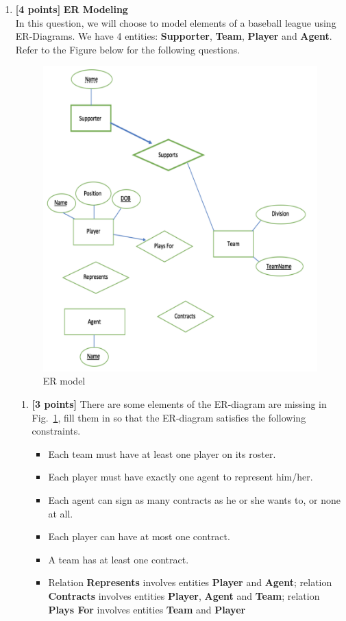 \documentclass[10pt]{article}
\begin{document}
\begin{enumerate}

	\item \textbf{[4 points]} \textbf{ER Modeling} \\
	      In this question, we will choose to model elements of a baseball league using ER-Diagrams. We have 4 entities:
	      \textbf{Supporter}, \textbf{Team}, \textbf{Player} and \textbf{Agent}. Refer to the Figure below for the following questions.
	      \begin{figure}[ht]
		      \centering
		      \includegraphics[width=0.7\linewidth]{pro2}
		      \caption{ER model}
		      \label{fig_pro2}
	      \end{figure}

	      \begin{enumerate}
		      \item \textbf{[3 points]} There are some elements of the ER-diagram are missing in Fig.~\ref{fig_pro2},
		            fill them in so that the ER-diagram satisfies the following constraints.
		            \begin{itemize}
			            \item Each team must have at least one player on its roster.
			            \item Each player must have exactly one agent to represent him/her.
			            \item Each agent can sign as many contracts as he or she wants to, or none at all.
			            \item Each player can have at most one contract.
			            \item A team has at least one contract.
			            \item Relation \textbf{Represents} involves entities \textbf{Player} and \textbf{Agent}; relation \textbf{Contracts} involves
			                  entities \textbf{Player}, \textbf{Agent} and \textbf{Team}; relation \textbf{Plays For} involves entities \textbf{Team} and \textbf{Player}
		            \end{itemize}


\end{enumerate}
\end{enumerate}
\end{document}
